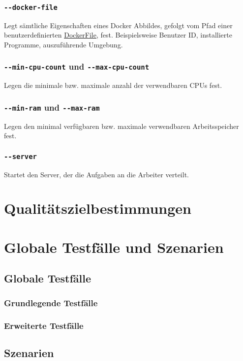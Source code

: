 \documentclass[a4paper,12pt]{article}
\begin{document}
\subsubsection{\texttt{-{}-docker-file}}
Legt sämtliche Eigenschaften eines Docker Abbildes, gefolgt vom Pfad einer benutzerdefinierten \href{https://docs.docker.com/engine/reference/builder/}{DockerFile}, fest.
Beispielsweise Benutzer ID, installierte Programme, auszuführende Umgebung.

\subsubsection{\texttt{-{}-min-cpu-count} und \texttt{-{}-max-cpu-count}}
Legen die minimale bzw. maximale anzahl der verwendbaren \glspl{CPU} fest.

\subsubsection{\texttt{-{}-min-ram} und \texttt{-{}-max-ram}}
Legen den minimal verfügbaren bzw. maximale verwendbaren Arbeitsspeicher fest.

\subsubsection{\texttt{-{}-server}}
Startet den Server, der die Aufgaben an die Arbeiter verteilt.

\section{Qualitätszielbestimmungen}

\section{Globale Testfälle und Szenarien}
\subsection{Globale Testfälle}
\subsubsection{Grundlegende Testfälle}
\subsubsection{Erweiterte Testfälle}
\subsection{Szenarien}
\end{document}
